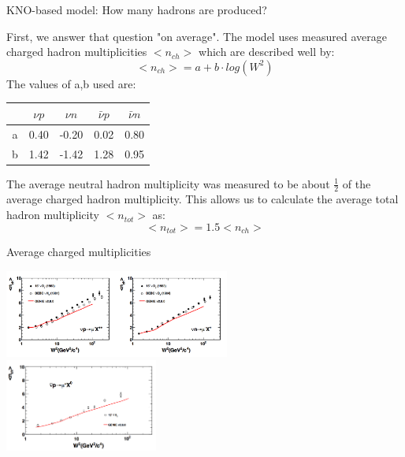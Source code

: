 \begin{frame}{KNO-based model: How many hadrons are produced?}

First, we answer that question "on average".
The model uses measured average charged hadron multiplicities $<n_{ch}>$ which are described well by:\\
\[
  <n_{ch}> = a + b \cdot log(W^{2})
\]
The values of a,b used are:\\
\begin{table}[ht]
\centering
\begin{tabular}{| c || c | c | c | c |}
\hline
           &    ${\nu}p$         & ${\nu}n$          &  ${\bar{\nu}}p$  & ${\bar{\nu}}n$ \\
\hline
  a        &    0.40             & -0.20             &  0.02            & 0.80  \\
  b        &    1.42             & -1.42             &  1.28            & 0.95  \\
\hline
\end{tabular}
\end{table}
The average neutral hadron multiplicity was measured to be about $\frac{1}{2}$ of the
average charged hadron multiplicity. This allows us to calculate the average total
hadron multiplicity $<n_{tot}>$ as:\\
\[
  <n_{tot}> = 1.5 <n_{ch}>
\]
\end{frame}



\begin{frame}{Average charged multiplicities}
\begin{center}
\includegraphics[width=280px]{./images/nuint/dis/avgnch_vs_W2.png}\\
\includegraphics[width=190px]{./images/nuint/dis/avgnch_vs_W2_nubar.png}\\
\end{center}
\end{frame}

